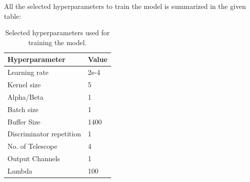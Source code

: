 All the selected hyperparameters to train the model is summarized in the given table:
\begin{table}[ht]
	\centering
	\caption{Selected hyperparameters used for training the model.}
	\label{tab:hyperparameters}
	\begin{tabular}{ll}
		\hline
		\textbf{Hyperparameter} & \textbf{Value} \\
		\hline
		Learning rate           & 2e-4 \\
		Kernel size             & 5 \\
		Alpha/Beta              & 1 \\
		Batch size              & 1 \\
		Buffer Size             & 1400 \\
		Discriminator repetition  & 1 \\
		No. of Telescope        & 4 \\
		Output Channels         & 1 \\
		Lambda                  & 100 \\
		\hline
	\end{tabular}
\end{table}

